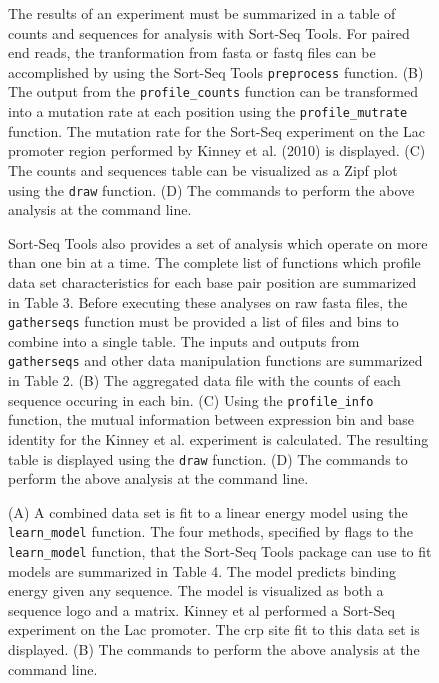 \documentclass{bmcart}
\begin{document}
%
%
\begin{figure}[h!]
\caption{
The results of an experiment must be summarized in a table of counts and sequences for analysis with Sort-Seq Tools. For paired end reads, the tranformation from fasta or fastq files can be accomplished by using the Sort-Seq Tools \texttt{preprocess} function. (B)  The output from the \texttt{profile\_counts} function can be transformed into a mutation rate at each position using the \texttt{profile\_mutrate} function. The mutation rate for the Sort-Seq experiment on the Lac promoter region performed by Kinney et al. (2010) is displayed. (C) The counts and sequences table can be visualized as a Zipf plot using the \texttt{draw} function. (D) The commands to perform the above analysis at the command line.
}
\end{figure}

%
%
\begin{figure}[h!] 
\caption{
Sort-Seq Tools also provides a set of analysis which operate on more than one bin at a time. The complete list of functions which profile data set characteristics for each base pair position are summarized in Table 3. Before executing these analyses on raw fasta files, the \texttt{gatherseqs} function must be provided a list of files and bins to combine into a single table. The inputs and outputs from \texttt{gatherseqs} and other data manipulation functions are summarized in Table 2. (B) The aggregated data file with the counts of each sequence occuring in each bin. (C) Using the \texttt{profile\_info} function, the mutual information between expression bin and base identity for the Kinney et al. experiment is calculated. The resulting table is displayed using the \texttt{draw} function. (D) The commands to perform the above analysis at the command line.
}
\end{figure}

%
%
\begin{figure}[h!]
\caption{
(A) A combined data set is fit to a linear energy model using the \texttt{learn\_model} function. The four methods, specified by flags to the \texttt{learn\_model} function, that the Sort-Seq Tools package can use to fit models are summarized in Table 4. The model predicts
binding energy given any sequence. The model is visualized as both a
sequence logo and a matrix. Kinney et al performed a Sort-Seq experiment on the 
Lac promoter. The crp site fit to this data set is displayed. (B) The commands to perform the above analysis at the command line.
}
\end{figure}
\end{document}

